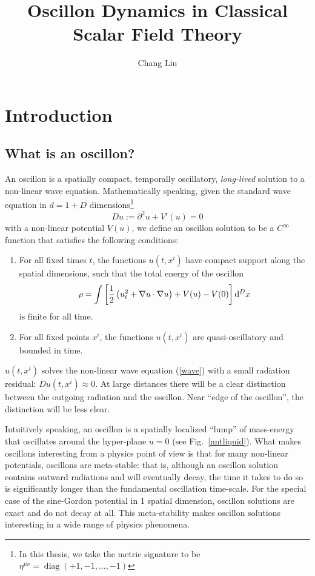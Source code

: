 \documentclass{report}
\def\dd{{\rm d}}
\DeclareMathOperator{\diag}{diag}
\begin{document}
\title{Oscillon Dynamics in Classical\\ Scalar Field Theory}
\author{Chang Liu}
\maketitle

\tableofcontents

\chapter{Introduction}
\section{What is an oscillon?}
An oscillon is a spatially compact, temporally oscillatory, {\em long-lived} solution to a non-linear wave equation. Mathematically speaking, given the standard wave equation in $d=1+D$ dimensions\footnote{In this thesis, we take the metric signature to be $\eta^{\mu\nu} = \diag(+1,-1,\ldots,-1)$}
\begin{equation}\label{wave}
  Du := \partial^2 u + V'(u) = 0
\end{equation}
with a non-linear potential $V(u)$, we define an oscillon solution to be a $C^\infty$ function that satisfies the following conditions:
\begin{enumerate}
\item For all fixed times $t$, the functions $u(t, x^i)$ have compact support along the spatial dimensions, such that the total energy of the oscillon
  \begin{equation}
    \rho = \int \left[\frac{1}{2}\left(u_t^2+ \nabla u\cdot \nabla u \right) + V(u) - V(0)\right] \dd^D x
  \end{equation}
  is finite for all time.
\item For all fixed points $x^i$, the functions $u(t, x^i)$ are quasi-oscillatory and bounded in time.
\end{enumerate}

$u(t,x^i)$ solves the non-linear wave equation (\ref{wave}) with a small radiation residual: $Du(t,x^i) \approx 0$. At large distances there will be a clear distinction between the outgoing radiation and the oscillon. Near ``edge of the oscillon'', the distinction will be less clear.

Intuitively speaking, an oscillon is a spatially localized ``lump'' of mass-energy that oscillates around the hyper-plane $u=0$ (see Fig.~\ref{nntliquid}). What makes oscillons interesting from a physics point of view is that for many non-linear potentials, oscillons are meta-stable: that is, although an oscillon solution contains outward radiations and will eventually decay, the time it takes to do so is significantly longer than the fundamental oscillation time-scale. For the special case of the sine-Gordon potential in 1 spatial dimension, oscillon solutions are exact and do not decay at all. This meta-stability makes oscillon solutions interesting in a wide range of physics phenomena.
\end{document}
